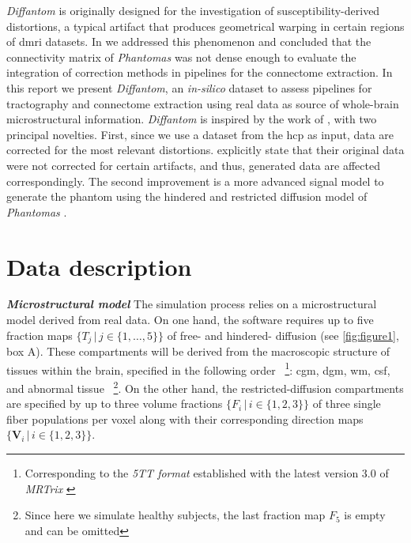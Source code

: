 \documentclass[english]{frontiers/frontiersSCNS} %
\newcommand{\vmaps}{\ensuremath{\{\mathbf{V}_i \,|\, i \in \{1,2,3\}\}}}
\newcommand{\fmaps}{\ensuremath{\{F_i \,|\, i \in \{1,2,3\}\}}}
\newcommand{\tmaps}{\ensuremath{\{T_j \,|\, j \in \{1,\ldots,5\}\}}}
\begin{document}
\emph{Diffantom} is originally designed for the investigation of susceptibility-derived distortions, a
  typical artifact that produces geometrical warping in certain regions of \gls*{dmri} datasets.
In \citep{esteban_simulationbased_2014} we addressed this phenomenon and concluded that the connectivity
  matrix of \emph{Phantomas} was not dense enough to evaluate the integration of correction methods
  in pipelines for the connectome extraction.
In this report we present \emph{Diffantom}, an \emph{in-silico} dataset to assess pipelines for tractography
  and connectome extraction using real data as source of whole-brain microstructural information.
\emph{Diffantom} is inspired by the work of \cite{wilkins_fiber_2014}, with two principal novelties.
First, since we use a dataset from the \gls*{hcp} as input, data are corrected for the most relevant distortions.
\cite{wilkins_fiber_2014} explicitly state that their original data were not corrected for certain artifacts,
  and thus, generated data are affected correspondingly.
The second improvement is a more advanced signal model to generate the phantom using the hindered and restricted
  diffusion model of \emph{Phantomas} \citep{caruyer_phantomas_2014}.


\section*{Data description}

\noindent\textbf{\textit{Microstructural model\textcolon}\label{sec:data_model}} %
The simulation process relies on a microstructural model derived from real data.
On one hand, the software requires up to five fraction maps \tmaps{} of
  free- and hindered- diffusion (see \autoref{fig:figure1}, box A).
These compartments will be derived from the macroscopic structure of tissues within the brain,
  specified in the following order~%
\footnote{Corresponding to the \emph{5TT format} established with the latest version 3.0
  of \emph{MRTrix} \citep{tournier_mrtrix_2012}}:
\gls*{cgm}, \gls*{dgm}, \gls*{wm}, \gls*{csf}, and abnormal tissue~%
\footnote{Since here we simulate healthy subjects, the last fraction map $F_5$ is empty and can be omitted}.
On the other hand, the restricted-diffusion compartments are specified by up to three volume fractions \fmaps{}
  of three single fiber populations per voxel along with their corresponding direction maps \vmaps{}.
\end{document}

